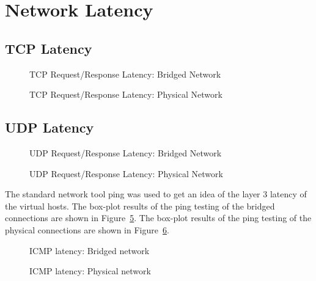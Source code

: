 \section{Network Latency} %
\label{sec:networklatency}

\subsection{TCP Latency} %
\label{sub:tcplatency}
\begin{figure}
    \centering
    \def\svgwidth{\columnwidth}
    
    \caption{TCP Request/Response Latency: Bridged Network}
    \label{fig:tcp_rr_bridge}
\end{figure}
\begin{figure}
    \centering
    \def\svgwidth{\columnwidth}
    
    \caption{TCP Request/Response Latency: Physical Network}
    \label{fig:tcp_rr_phys}
\end{figure}


\subsection{UDP Latency} %
\label{sub:udplatency}
\begin{figure}
    \centering
    \def\svgwidth{\columnwidth}
    
    \caption{UDP Request/Response Latency: Bridged Network}
    \label{fig:udp_rr_bridge}
\end{figure}
\begin{figure}
    \centering
    \def\svgwidth{\columnwidth}
    
    \caption{UDP Request/Response Latency: Physical Network}
    \label{fig:udp_rr_phys}
\end{figure}

\label{sub:icmplatency}
The standard network tool ping was used to get an idea of the layer 3 latency of the virtual hosts.  
The box-plot results of the ping testing of the bridged connections are shown in Figure~\ref{fig:icmplatencybridge}.  
The box-plot results of the ping testing of the physical connections are shown in Figure~\ref{fig:icmplatencyphys}.  
\begin{figure}
    \centering
    \def\svgwidth{\columnwidth}
    
    \caption{ICMP latency: Bridged network}
    \label{fig:icmplatencybridge}
\end{figure}
\begin{figure}
    \centering
    \def\svgwidth{\columnwidth}
    
    \caption{ICMP latency: Physical network}
    \label{fig:icmplatencyphys}
\end{figure}

